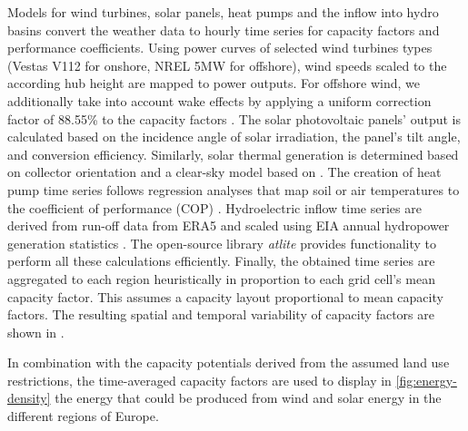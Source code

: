 Models for wind turbines, solar panels, heat pumps and the inflow into hydro
basins convert the weather data to hourly time series for capacity factors and
performance coefficients. Using power curves of selected wind turbines types
(Vestas V112 for onshore, NREL 5MW for offshore), wind speeds scaled to the
according hub height are mapped to power outputs. For offshore wind, we
additionally take into account wake effects by applying a uniform correction
factor of 88.55\% to the capacity factors \citeS{}. The solar photovoltaic
panels' output is calculated based on the incidence angle of solar irradiation,
the panel's tilt angle, and conversion efficiency. Similarly, solar thermal
generation is determined based on collector orientation and a clear-sky model
based on . The creation of heat pump time
series follows regression analyses that map soil or air temperatures to the
coefficient of performance (COP) . Hydroelectric inflow time series are derived from
run-off data from ERA5 and scaled using EIA annual hydropower generation
statistics \citeS{}. The open-source library \textit{atlite} \citeS{} provides
functionality to perform all these calculations efficiently. Finally, the
obtained time series are aggregated to each region heuristically in proportion
to each grid cell's mean capacity factor. This assumes a capacity layout
proportional to mean capacity factors. The resulting spatial and temporal
variability of capacity factors are shown in
.

In combination with the capacity potentials derived from the assumed land use
restrictions, the time-averaged capacity factors are used to display in
\cref{fig:energy-density} the energy that could be produced from wind and solar
energy in the different regions of Europe.
